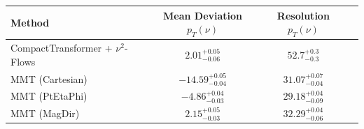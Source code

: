     \begin{tabular}{lccc}
        \toprule
        Method & Mean Deviation $p_{T}({\nu})$ & Resolution $p_{T}({\nu})$ \\
        \midrule
        CompactTransformer + $\nu^2$-Flows & $2.01^{+0.05}_{-0.06}$ & $52.7^{+0.3}_{-0.3}$ \\
        MMT (Cartesian) & $-14.59^{+0.05}_{-0.04}$ & $31.07^{+0.07}_{-0.04}$ \\
        MMT (PtEtaPhi) & $-4.86^{+0.04}_{-0.03}$ & $29.18^{+0.04}_{-0.09}$ \\
        MMT (MagDir) & $2.15^{+0.05}_{-0.03}$ & $32.29^{+0.04}_{-0.06}$ \\
        \bottomrule
    \end{tabular}